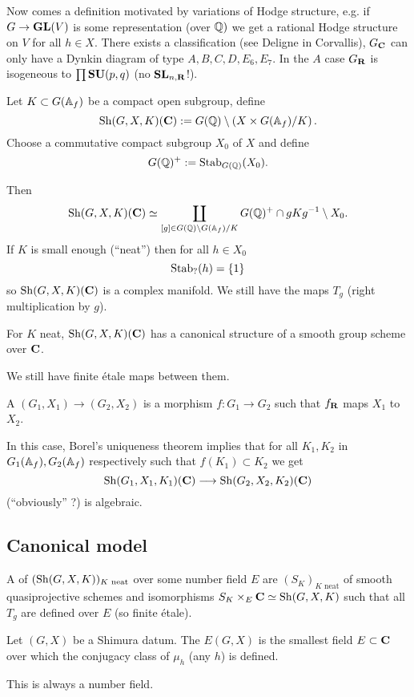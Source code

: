 Now comes a definition motivated by variations of Hodge structure, e.g. if $G\to \GL(V)$ is some representation (over $\mathbb Q)$ we get a rational Hodge structure on $V$ for all $h\in X$. There exists a classification (see Deligne in Corvallis), $G_{\mathbf{C}}$ can only have a Dynkin diagram of type $A,B,C,D,E_6,E_7$. In the $A$ case $G_{\mathbf{R}}$ is isogeneous to $\prod \mathbf{SU}(p,q)$ (no $\mathbf{SL}_{n,\mathbf{R}}$!).

\begin{definition}
	Let $K\subset G(\mathbb{A}_f)$ be a compact open subgroup, define
	\[
	\operatorname{Sh}(G,X,K)(\mathbf{C}) := G(\mathbb Q) \setminus \left( X\times G(\mathbb{A}_f) / K \right) .
	\] 
	Choose a commutative compact subgroup $X_0$ of $X$ and define
	\[
	G(\mathbb Q)^{+} := \operatorname{Stab}_{G(\mathbb Q)}(X_0).
	\] 
\end{definition}
Then
\[
	\operatorname{Sh}(G,X,K)(\mathbf{C}) \simeq \coprod_{[g]\in G(\mathbb Q)\setminus G(\mathbb{A}_f) / K}G(\mathbb Q)^{+}\cap gKg^{-1}\setminus X_0.
\] 
If $K$ is small enough (``neat'') then for all $h\in X_0$ 
\[
\operatorname{Stab}_{?}(h) = \{1\} 
\] 
so $\operatorname{Sh}(G,X,K)(\mathbf{C})$ is a complex manifold. We still have the maps $T_g$ (right multiplication by $g$).
\begin{theorem}
	For $K$ neat, $\operatorname{Sh}(G,X,K)(\mathbf{C})$ has a canonical structure of a smooth group scheme over $\mathbf{C}$. 
\end{theorem}
We still have finite \'etale maps between them.
\begin{definition}
	A  $(G_1,X_1)\to (G_2,X_2)$ is a morphism $f:G_1\to G_2$ such that $f_\mathbf{R}$ maps $X_1$ to $X_2$.
\end{definition}
In this case, Borel's uniqueness theorem implies that for all $K_1,K_2$ in $G_1(\mathbb{A}_f), G_2(\mathbb{A}_f)$ respectively such that $f(K_1)\subset K_2$ we get
\[
\Sh(G_1,X_1,K_1)(\C) \to \Sh(G_2,X_2,K_2)(\C)
\] 
(``obviously'' ?) is algebraic.

\subsection{Canonical model}
\begin{definition}
	A  of $(\operatorname{Sh}(G,X,K))_{K\text{ neat}}$ over some number field $E$ are $(S_K)_{K\text{ neat}}$ of smooth quasiprojective schemes and isomorphisms $S_K\times_E \mathbf{C}\simeq \operatorname{Sh}(G,X,K)$ such that all $T_g$ are defined over $E$ (so finite \'etale).
\end{definition}
\begin{definition}
	Let $(G,X)$ be a Shimura datum. The  $E(G,X)$ is the smallest field $E\subset \mathbf{C}$ over which the conjugacy class of $\mu_h$ (any $h$) is defined.
\end{definition}
This is always a number field.

